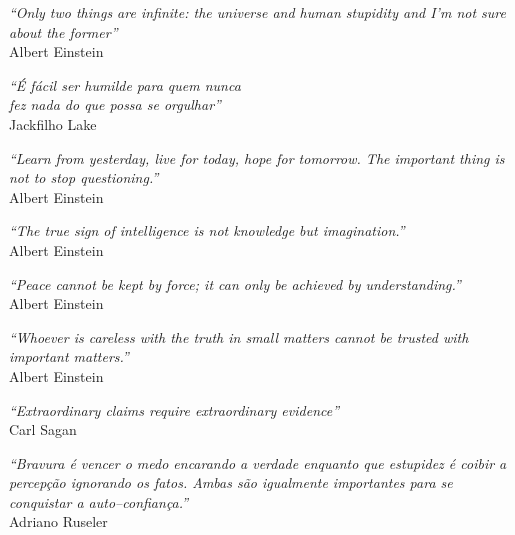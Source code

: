 \documentclass[
10.5pt, %
a5paper, %
twoside, %
english,
brazil,
sumario=UFSC,
chapter=TITLE, %
section=TITLE  %
]{ufsc-inep-thesis}
\begin{document}
\begin{epigrafe}
	\vspace*{\fill}
	\begin{flushright}
		\textit{``Only two things are infinite: the universe and human stupidity and I'm not sure about the former''}\\Albert Einstein
	\end{flushright}
	\begin{flushright}
		\textit{``É fácil ser humilde para quem nunca\\ fez nada do que possa se orgulhar''}\\Jackfilho Lake
	\end{flushright}
	\begin{flushright}
		\textit{``Learn from yesterday, live for today, hope for tomorrow. The important thing is not to stop questioning.''}\\	Albert Einstein		
	\end{flushright}
	\begin{flushright}
		\textit{``The true sign of intelligence is not knowledge but imagination.''}\\	Albert Einstein		
	\end{flushright}
	\begin{flushright}
		\textit{``Peace cannot be kept by force; it can only be achieved by understanding.''}\\	Albert Einstein		
	\end{flushright}
	\begin{flushright}
		\textit{``Whoever is careless with the truth in small matters cannot be trusted with important matters.''}\\	Albert Einstein		
	\end{flushright}		
	\begin{flushright}
		\textit{``Extraordinary claims require extraordinary evidence''}\\
		Carl Sagan
	\end{flushright}
	\begin{flushright}
		\textit{``Bravura é vencer o medo encarando a verdade enquanto que estupidez é coibir a percepção ignorando os fatos. Ambas são igualmente importantes para se conquistar a auto--confiança.''}\\
		Adriano Ruseler
	\end{flushright}
	

\end{epigrafe}
\end{document}
